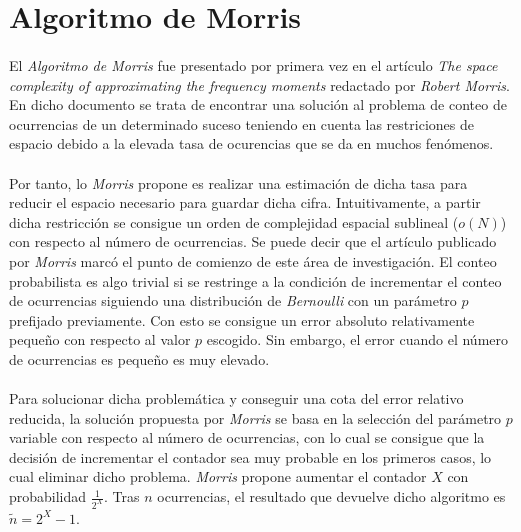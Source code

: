 \documentclass{subfiles}
\begin{document}
    \section{Algoritmo de Morris}
    \label{sec:streaming_morris_algorithm}

      \paragraph{}
      El \emph{Algoritmo de Morris} fue presentado por primera vez en el artículo \emph{The space complexity of approximating the frequency moments} \cite{alon1996space} redactado por \emph{Robert Morris}. En dicho documento se trata de encontrar una solución al problema de conteo de ocurrencias de un determinado suceso teniendo en cuenta las restriciones de espacio debido a la elevada tasa de ocurencias que se da en muchos fenómenos.

      \paragraph{}
      Por tanto, lo \emph{Morris} propone es realizar una estimación de dicha tasa para reducir el espacio necesario para guardar dicha cifra. Intuitivamente, a partir dicha restricción se consigue un orden de complejidad espacial sublineal ($o(N)$) con respecto al número de ocurrencias. Se puede decir que el artículo publicado por \emph{Morris} marcó el punto de comienzo de este área de investigación. El conteo probabilista es algo trivial si se restringe a la condición de incrementar el conteo de ocurrencias siguiendo una distribución de \emph{Bernoulli} con un parámetro $p$ prefijado previamente. Con esto se consigue un error absoluto relativamente pequeño con respecto al valor $p$ escogido. Sin embargo, el error cuando el número de ocurrencias es pequeño es muy elevado.


      \paragraph{}
      Para solucionar dicha problemática y conseguir una cota del error relativo reducida, la solución propuesta por \emph{Morris} se basa en la selección del parámetro $p$ variable con respecto al número de ocurrencias, con lo cual se consigue que la decisión de incrementar el contador sea muy probable en los primeros casos, lo cual eliminar dicho problema. \emph{Morris} propone aumentar el contador $X$ con probabilidad $\frac{1}{2^X}$. Tras $n$ ocurrencias, el resultado que devuelve dicho algoritmo es $\widetilde{n} = 2^X -1$.
\end{document}
